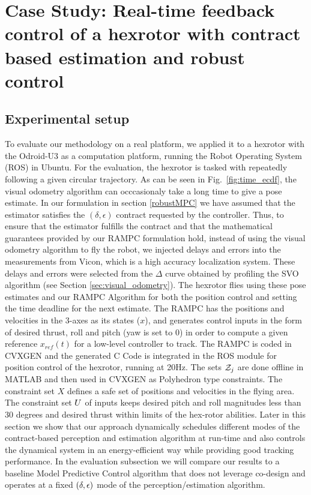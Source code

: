 \section{Case Study: Real-time feedback control of a hexrotor with contract based estimation and robust control}
\label{sec:experiments}

\subsection{Experimental setup}
To evaluate our methodology on a real platform, we applied it to a hexrotor with the Odroid-U3 as a computation platform, running the Robot Operating System (ROS) \cite{ROS288} in Ubuntu. For the evaluation, the hexrotor is tasked with repeatedly following a given circular trajectory.
As can be seen in Fig.~\ref{fig:time_ecdf}, the visual odometry algorithm can occcasionaly take a long time to give a pose estimate. In our formulation in section \ref{robustMPC} we have assumed that the estimator satisfies the $(\delta, \epsilon)$ contract requested by the controller. Thus, to ensure that the estimator fulfills the contract and that the mathematical guarantees provided by our RAMPC formulation hold, instead of using the visual odometry algorithm to fly the robot, 
we injected delays and errors into the measurements from Vicon, which is a high accuracy localization system. 
These delays and errors were selected from the $\Delta$ curve obtained by profiling the SVO algorithm (see Section \ref{sec:visual_odometry}).
The hexrotor flies using these pose estimates and our RAMPC Algorithm for both the position control and setting the time deadline for the next estimate. 
The RAMPC has the positions and velocities in the 3-axes as its states ($x$), and generates control inputs in the form of desired thrust, roll and pitch (yaw is set to 0) in order to compute a given reference $x_{ref}(t)$ for a low-level controller to track. 
The RAMPC is coded in CVXGEN \cite{cvxgen} and the generated C Code is integrated in the ROS module for position control of the hexrotor, running at 20Hz. 
The sets $\mathcal{Z}_j$ are done offline in MATLAB and then used in CVXGEN as Polyhedron type constraints. 
The constraint set $X$ defines a safe set of positions and velocities in the flying area. 
The constraint set $U$ of inputs keeps desired pitch and roll magnitudes less than $30$ degrees and desired thrust within limits of the hex-rotor abilities.
Later in this section we show that our approach dynamically schedules different modes of the contract-based perception and estimation algorithm at run-time and also controls the dynamical system in an energy-efficient way while providing good tracking performance. 
In the evaluation subsection we will compare our results to a baseline Model Predictive Control algorithm that does not leverage co-design and operates at a fixed $(\delta,\epsilon)$ mode of the perception/estimation algorithm.

